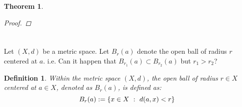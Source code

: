 \documentclass[]{article}
\newcommand{\N}{\mathbb{N}}
\newcommand{\divisible}{ \ \vdots \ }
\newcommand{\st}{\ : \ }
\newtheorem{definition}{Definition}
\newtheorem{theorem}{Theorem}
\begin{document}
\begin{theorem}
\begin{proof}
        
        
        

        


    \end{proof}
\end{theorem}




\newpage
\section{}
Let $(X,d)$ be a metric space.
Let $B_r(a)$ denote the open ball of radius $r$ centered at $a$.
i.e.
Can it happen that $B_{r_1}(a) \subset B_{r_2}(a)$ but $r_1 > r_2$?

\begin{definition}\label{def:open_ball}
    Within the metric space $(X,d)$, 
    the open ball of radius $r \in X$ centered at $a \in X$, 
    denoted as $B_r(a)$, is defined as:
    \[
        B_r(a) := \qty{x \in X \st d(a,x) < r}
    \]
\end{definition}
\end{document}
